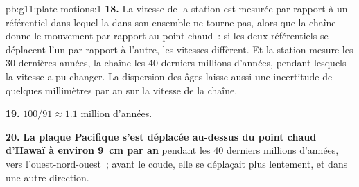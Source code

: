 \begin{solution}{pb:g11:plate-motions:1}
\textbf{18.} La vitesse de la station est mesurée par rapport à un
référentiel dans lequel la  dans son ensemble ne tourne pas,
alors que la chaîne donne le mouvement par rapport au point chaud~: si les
deux référentiels se déplacent l'un par rapport à l'autre, les vitesses
diffèrent. Et la station mesure les 30 dernières années, la chaîne les
40 derniers millions d'années, pendant lesquels la vitesse a pu changer. La
dispersion des âges laisse aussi une incertitude de quelques millimètres par
an sur la vitesse de la chaîne.

\textbf{19.} $100/91 \approx 1.1$ million d'années.

\textbf{20.} \textbf{La plaque Pacifique s'est déplacée au-dessus du point
chaud d'Hawaï à environ \qty{9}{cm} par an} pendant les 40 derniers millions
d'années, vers l'ouest-nord-ouest~; avant le coude, elle se déplaçait plus
lentement, et dans une autre direction.
\end{solution}
